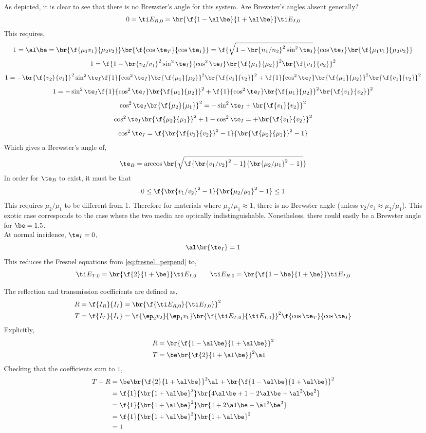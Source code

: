 \documentclass{article}
\begin{document}
As depicted, it is clear to see that there is no Brewster's angle for this system. Are Brewster's angles absent generally?
\[ 0 = \ti E_{R,0} = \br{\f{1-\al\be}{1+\al\be}} \ti E_{I,0} \]
This requires,
\[ 1 = \al\be = \br{\f{\mu_1 v_1}{\mu_2 v_2}}\br{\f{\cos \te_T}{\cos \te_I}} = \f{\sqrt{1 - \br{n_1/n_2}^2\sin^2 \te_I}}{\cos \te_I}\br{\f{\mu_1 v_1}{\mu_2 v_2}} \]
\[ 1 = \f{1 - \br{v_2/v_1}^2\sin^2 \te_I}{\cos^2 \te_I}\br{\f{\mu_1}{\mu_2}}^2\br{\f{v_1}{v_2}}^2 \]
\[ 1 = - \br{\f{v_2}{v_1}}^2\sin^2 \te_I\f{1}{\cos^2 \te_I}\br{\f{\mu_1}{\mu_2}}^2\br{\f{v_1}{v_2}}^2 +   \f{1}{\cos^2 \te_I}\br{\f{\mu_1}{\mu_2}}^2\br{\f{v_1}{v_2}}^2 \]
\[ 1 = - \sin^2 \te_I\f{1}{\cos^2 \te_I}\br{\f{\mu_1}{\mu_2}}^2+\f{1}{\cos^2 \te_I}\br{\f{\mu_1}{\mu_2}}^2\br{\f{v_1}{v_2}}^2 \]
\[ \cos^2 \te_I \br{\f{\mu_2}{\mu_1}}^2 = -\sin^2 \te_I+\br{\f{v_1}{v_2}}^2 \]
\[ \cos^2 \te_I \br{\f{\mu_2}{\mu_1}}^2 + 1 - \cos^2 \te_I = +\br{\f{v_1}{v_2}}^2 \]
\[ \cos^2 \te_I = \f{\br{\f{v_1}{v_2}}^2 - 1}{\br{\f{\mu_2}{\mu_1}}^2 - 1} \]
Which gives a Brewster's angle of,
\[ \te_B = \arccos\br{\sqrt{\f{\br{{v_1}/{v_2}}^2 - 1}{\br{{\mu_2}/{\mu_1}}^2 - 1}}} \]
In order for $\te_B$ to exist, it must be that
\[ 0 \leq \f{\br{{v_1}/{v_2}}^2 - 1}{\br{{\mu_2}/{\mu_1}}^2 - 1} \leq 1 \]
This requires ${\mu_2}/{\mu_1}$ to be different from $1$. Therefore for materials where ${\mu_2}/{\mu_1} \approx 1$, there is no Brewster angle (unless ${v_2}/{v_1} \approx {\mu_2}/{\mu_1}$). This exotic case corresponds to the case where the two media are optically indistinguishable. Nonetheless, there could easily be a Brewster angle for $\be = 1.5$.\\

At normal incidence, $\te_I = 0$,
\[ \al\br{\te_I} = 1 \]
This reduces the Fresnel equations from \cref{eq:fresnel_perpend} to,
\[ \ti E_{T,0} = \br{\f{2}{1 +  \be}}\ti E_{I,0} \qquad \ti E_{R,0} = \br{\f{1 - \be}{1 +  \be}}\ti E_{I,0}\]

The reflection and transmission coefficients are defined as,
\begin{align*}
    R &= \f{I_R}{I_I} = \br{\f{\ti E_{R,0}}{\ti E_{I,0}}}^2 \\
    T &= \f{I_T}{I_I} = \f{\ep_2 v_2}{\ep_1 v_1}\br{\f{\ti E_{T,0}}{\ti E_{I,0}}}^2 \f{\cos \te_T}{\cos \te_I}
\end{align*}
Explicitly,
\begin{align*}
    R &= \br{\f{1 - \al\be}{1 + \al\be}}^2 \\
    T &= \be\br{\f{2}{1+\al\be}}^2 \al
\end{align*}
Checking that the coefficients sum to $1$,
\begin{align*}
    T + R
    &= \be\br{\f{2}{1+\al\be}}^2 \al + \br{\f{1 - \al\be}{1 + \al\be}}^2 \\
    &= \f{1}{\br{1 + \al\be}^2} \br{4 \al\be + 1 - 2 \al\be + \al^2\be^2} \\
    &= \f{1}{\br{1 + \al\be}^2} \br{1 + 2 \al\be + \al^2\be^2} \\
    &= \f{1}{\br{1 + \al\be}^2} \br{1 + \al\be}^2 \\
    &= 1
\end{align*}
\end{document}
